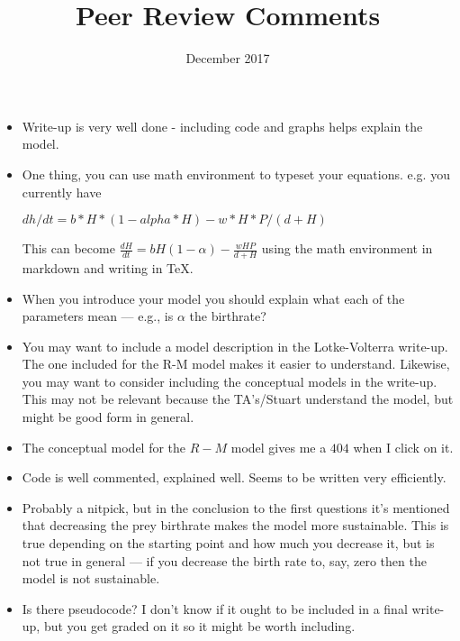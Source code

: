 \documentclass{article}
\title{Peer Review Comments}
\date{December 2017}
\theoremstyle{definition}
\theoremstyle{remark}
\begin{document}
\maketitle

\begin{itemize}
\item Write-up is very well done - including code and graphs helps explain the model.

\item One thing, you can use math environment to typeset your equations.  e.g. you currently have

$dh/dt=b*H*(1-alpha*H)-w*H*P/(d+H)$

This can become $\frac{dH}{dt}=bH(1-\alpha)-\frac{wHP}{d+H}$ using the math environment in markdown and writing in TeX.  

\item When you introduce your model you should explain what each of the parameters mean --- e.g., is $\alpha$ the birthrate?

\item You may want to include a model description in the Lotke-Volterra write-up.  The one included for the R-M model makes it easier to understand.  Likewise, you may want to consider including the conceptual models in the write-up. This may not be relevant because the TA's/Stuart understand the model, but might be good form in general.

\item The conceptual model for the $R-M$ model gives me a $404$ when I click on it.

\item Code is well commented, explained well.  Seems to be written very efficiently.

\item Probably a nitpick, but in the conclusion to the first questions it's mentioned that decreasing the prey birthrate makes the model more sustainable.  This is true depending on the starting point and how much you decrease it, but is not true in general --- if you decrease the birth rate to, say, zero then the model is not sustainable.  

\item Is there pseudocode?  I don't know if it ought to be included in a final write-up, but you get graded on it so it might be worth including.  
\end{itemize}
\end{document}
